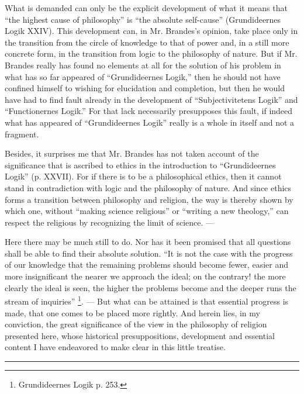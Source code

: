 \documentclass[12pt,a4paper]{book}
\newcommand{\opage}[1]{\marginnote{\footnotesize\textit{[#1]}}}
\begin{document}
What is demanded can only be the explicit development
of what it means that ``the highest cause of philosophy'' is
``the absolute self-cause'' (Grundideernes Logik XXIV).
This development can, in Mr. Brandes's opinion, take place only
in the transition from the circle of knowledge to that of power and, in a still
\opage{46}\setcounter{footnote}{0}%
more concrete form, in the transition from logic to the philosophy of nature.
But if Mr. Brandes really has found no
elements at all for the solution of his problem in what has so far appeared of
``Grundideernes Logik,'' then he should not have confined
himself to wishing for elucidation and completion, but
then he would have had to find fault already in the development of ``Subjectivitetens
Logik'' and ``Functionernes Logik.'' For that lack
necessarily presupposes this fault, if indeed what has appeared of
``Grundideernes Logik'' really is a whole in itself and not a
fragment.

Besides, it surprises me that Mr. Brandes has not taken
account of the significance that is ascribed to ethics in the introduction to ``Grundideernes
Logik'' (p. XXVII). For if there is to
be a philosophical ethics, then it cannot stand in contradiction
with logic and the philosophy of nature. And since ethics
forms a transition between philosophy and religion, the
way is thereby shown by which one, without ``making science
religious'' or ``writing a new theology,'' can respect the
religious by recognizing the limit of science. ---

Here there may be much still to do. Nor has it been
promised that all questions shall be able to find their absolute
solution. ``It is not the case with the progress of our knowledge
that the remaining problems should become fewer, easier
and more insignificant the nearer we approach the ideal; on the contrary! the
more clearly the ideal is seen, the higher the problems become and the
deeper runs the stream of inquiries''%
\footnote{Grundideernes Logik p. 253.}. --- But what
can be attained is that essential progress is made, that one
comes to be placed more rightly. And herein lies, in my conviction,
the great significance of the view in the philosophy of religion
presented here, whose historical presuppositions, development and
essential content I have endeavored to make clear
in this little treatise.

\begin{center}\rule{0.2\textwidth}{0.8pt}\end{center}
\end{document}
